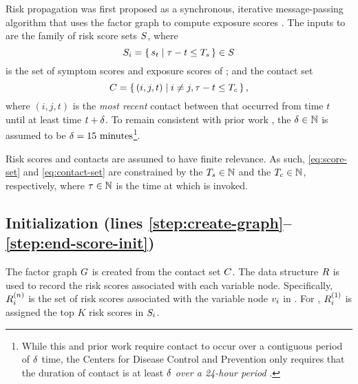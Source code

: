 Risk propagation was first proposed as a synchronous, iterative message-passing algorithm that uses the factor graph to compute exposure scores \cite{Ayday2021}. The inputs to \cSyncRiskProp{} are the family of risk score sets $S$, where
%
\begin{equation} \label{eq:score-set}
    S_i =\set{ s_t | \tau- t \leq T_s} \in S
\end{equation}
%
is the set of symptom scores and exposure scores of ; and the contact set
%
\begin{equation} \label{eq:contact-set}
    C = \set{ (i, j, t) | i \neq j, \tau- t \leq T_c},
\end{equation}
%
where $(i, j, t)$ is the \emph{most recent} contact between  that occurred from time $t$ until at least time $t + \delta$. To remain consistent with prior work \cite{Ayday2021}, the  $\delta \in \mathbb{N}$ is assumed to be $\delta = 15 \text{ minutes}$\footnote{While this and prior work require contact to occur over a contiguous period of $\delta$ time, the Centers for Disease Control and Prevention only requires that the duration of contact is at least $\delta$ \emph{over a 24-hour period} \cite{CDC2021}.}.

Risk scores and contacts are assumed to have finite relevance. As such, \eqref{eq:score-set} and \eqref{eq:contact-set} are constrained by the  $T_s \in \mathbb{N}$ and the  $T_c \in \mathbb{N}$, respectively, where $\tau \in \mathbb{N}$ is the time at which \cSyncRiskProp{} is invoked.

\subsection{Initialization (lines \ref{step:create-graph}--\ref{step:end-score-init})}

The factor graph $G$ is created from the contact set $C$. The data structure $\scores$ is used to record the risk scores associated with each variable node. Specifically, $\iScores{i}{n}$ is the set of risk scores associated with the variable node $\vVariable[i]$ in . For , $\iScores{i}{1}$ is assigned the top $K$ risk scores in $S_i$.

